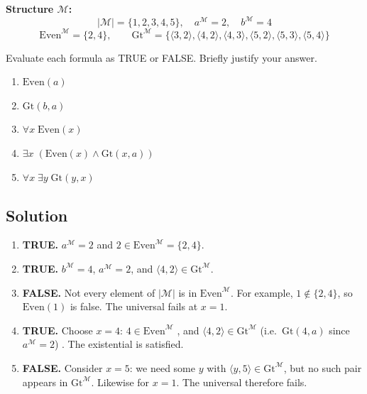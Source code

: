 \documentclass[11pt,a4paper]{article}
\newenvironment{solution}{%
	\begin{tcolorbox}[
		breakable,
		colback=green!4,
		colframe=green!50!black,
		fonttitle=\bfseries,
		title={ Solution},
		left=6pt, right=6pt, top=4pt, bottom=4pt
		]%
	}{%
	\end{tcolorbox}%
}
\begin{document}
\textbf{Structure $\mathcal{M}$:}
\[
|\mathcal{M}| = \{1,2,3,4,5\},\quad
a^{\mathcal{M}} = 2,\quad b^{\mathcal{M}} = 4
\]
\[
\mathrm{Even}^{\mathcal{M}} = \{2,4\},\qquad
\mathrm{Gt}^{\mathcal{M}} = \{\langle3,2\rangle,\langle4,2\rangle,\langle4,3\rangle,
\langle5,2\rangle,\langle5,3\rangle,\langle5,4\rangle\}
\]

Evaluate each formula as TRUE or FALSE. Briefly justify your answer.

\begin{enumerate}[label=(\alph*)]
	\item $\mathrm{Even}(a)$ 
	\item $\mathrm{Gt}(b,a)$ 
	\item $\forall x\;\mathrm{Even}(x)$ 
	\item $\exists x\;(\mathrm{Even}(x) \land \mathrm{Gt}(x,a))$ 
	\item $\forall x\;\exists y\;\mathrm{Gt}(y,x)$ 
\end{enumerate}

\subsection*{Solution}
\begin{solution}
\begin{enumerate}[label=(\alph*)]
	\item \textbf{TRUE.} $a^{\mathcal{M}} = 2$ and $2 \in \mathrm{Even}^{\mathcal{M}} = \{2,4\}$.

	\item \textbf{TRUE.} $b^{\mathcal{M}} = 4$, $a^{\mathcal{M}} = 2$, and $\langle 4,2\rangle \in \mathrm{Gt}^{\mathcal{M}}$.

	\item \textbf{FALSE.} Not every element of $|\mathcal{M}|$ is in $\mathrm{Even}^{\mathcal{M}}$. For example, $1 \notin \{2,4\}$, so $\mathrm{Even}(1)$ is false. The universal fails at $x = 1$.

	\item \textbf{TRUE.} Choose $x = 4$: $4 \in \mathrm{Even}^{\mathcal{M}}$ \checkmark, and $\langle 4,2\rangle \in \mathrm{Gt}^{\mathcal{M}}$ (i.e.\ $\mathrm{Gt}(4,a)$ since $a^{\mathcal{M}}=2$) \checkmark. The existential is satisfied.

	\item \textbf{FALSE.} Consider $x = 5$: we need some $y$ with $\langle y, 5\rangle \in \mathrm{Gt}^{\mathcal{M}}$, but no such pair appears in $\mathrm{Gt}^{\mathcal{M}}$. Likewise for $x = 1$. The universal therefore fails.
\end{enumerate}
\end{solution}
\end{document}
